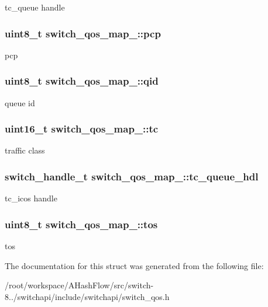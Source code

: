 tc\+\_\+queue handle \hypertarget{structswitch__qos__map___a984ee3d39aeabfeba04fda50ba26aeba}{
\subsubsection[{pcp}]{\setlength{\rightskip}{0pt plus 5cm}uint8\+\_\+t switch\+\_\+qos\+\_\+map\+\_\+\+::pcp}}\label{structswitch__qos__map___a984ee3d39aeabfeba04fda50ba26aeba}
pcp \hypertarget{structswitch__qos__map___af6d243013849a0eba46a0d4884738ce0}{
\subsubsection[{qid}]{\setlength{\rightskip}{0pt plus 5cm}uint8\+\_\+t switch\+\_\+qos\+\_\+map\+\_\+\+::qid}}\label{structswitch__qos__map___af6d243013849a0eba46a0d4884738ce0}
queue id \hypertarget{structswitch__qos__map___a6196f5599d0982b77ecf96a7e7a5be0d}{
\subsubsection[{tc}]{\setlength{\rightskip}{0pt plus 5cm}uint16\+\_\+t switch\+\_\+qos\+\_\+map\+\_\+\+::tc}}\label{structswitch__qos__map___a6196f5599d0982b77ecf96a7e7a5be0d}
traffic class \hypertarget{structswitch__qos__map___a842e81be713bff69429373269afe5e9e}{
\subsubsection[{tc\+\_\+queue\+\_\+hdl}]{\setlength{\rightskip}{0pt plus 5cm}switch\+\_\+handle\+\_\+t switch\+\_\+qos\+\_\+map\+\_\+\+::tc\+\_\+queue\+\_\+hdl}}\label{structswitch__qos__map___a842e81be713bff69429373269afe5e9e}
tc\+\_\+icos handle \hypertarget{structswitch__qos__map___aaf49110404a08639ad4eaf4d97d3b371}{
\subsubsection[{tos}]{\setlength{\rightskip}{0pt plus 5cm}uint8\+\_\+t switch\+\_\+qos\+\_\+map\+\_\+\+::tos}}\label{structswitch__qos__map___aaf49110404a08639ad4eaf4d97d3b371}
tos 

The documentation for this struct was generated from the following file\+:\begin{DoxyCompactItemize}
\item 
/root/workspace/\+A\+Hash\+Flow/src/switch-\/8../switchapi/include/switchapi/switch\+\_\+qos.\+h\end{DoxyCompactItemize}
